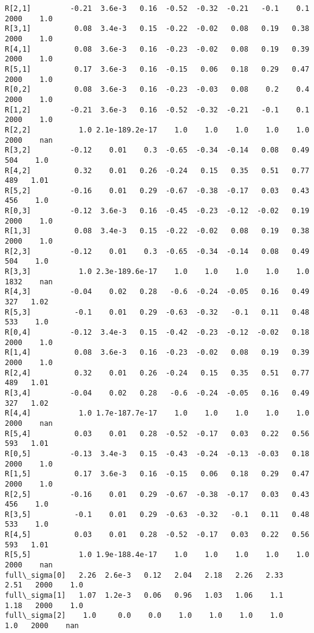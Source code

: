 \documentclass[11pt]{article}
\begin{document}
\begin{Verbatim}[commandchars=\\\{\}]
R[2,1]         -0.21  3.6e-3   0.16  -0.52  -0.32  -0.21   -0.1    0.1   2000    1.0
R[3,1]          0.08  3.4e-3   0.15  -0.22  -0.02   0.08   0.19   0.38   2000    1.0
R[4,1]          0.08  3.6e-3   0.16  -0.23  -0.02   0.08   0.19   0.39   2000    1.0
R[5,1]          0.17  3.6e-3   0.16  -0.15   0.06   0.18   0.29   0.47   2000    1.0
R[0,2]          0.08  3.6e-3   0.16  -0.23  -0.03   0.08    0.2    0.4   2000    1.0
R[1,2]         -0.21  3.6e-3   0.16  -0.52  -0.32  -0.21   -0.1    0.1   2000    1.0
R[2,2]           1.0 2.1e-189.2e-17    1.0    1.0    1.0    1.0    1.0   2000    nan
R[3,2]         -0.12    0.01    0.3  -0.65  -0.34  -0.14   0.08   0.49    504    1.0
R[4,2]          0.32    0.01   0.26  -0.24   0.15   0.35   0.51   0.77    489   1.01
R[5,2]         -0.16    0.01   0.29  -0.67  -0.38  -0.17   0.03   0.43    456    1.0
R[0,3]         -0.12  3.6e-3   0.16  -0.45  -0.23  -0.12  -0.02   0.19   2000    1.0
R[1,3]          0.08  3.4e-3   0.15  -0.22  -0.02   0.08   0.19   0.38   2000    1.0
R[2,3]         -0.12    0.01    0.3  -0.65  -0.34  -0.14   0.08   0.49    504    1.0
R[3,3]           1.0 2.3e-189.6e-17    1.0    1.0    1.0    1.0    1.0   1832    nan
R[4,3]         -0.04    0.02   0.28   -0.6  -0.24  -0.05   0.16   0.49    327   1.02
R[5,3]          -0.1    0.01   0.29  -0.63  -0.32   -0.1   0.11   0.48    533    1.0
R[0,4]         -0.12  3.4e-3   0.15  -0.42  -0.23  -0.12  -0.02   0.18   2000    1.0
R[1,4]          0.08  3.6e-3   0.16  -0.23  -0.02   0.08   0.19   0.39   2000    1.0
R[2,4]          0.32    0.01   0.26  -0.24   0.15   0.35   0.51   0.77    489   1.01
R[3,4]         -0.04    0.02   0.28   -0.6  -0.24  -0.05   0.16   0.49    327   1.02
R[4,4]           1.0 1.7e-187.7e-17    1.0    1.0    1.0    1.0    1.0   2000    nan
R[5,4]          0.03    0.01   0.28  -0.52  -0.17   0.03   0.22   0.56    593   1.01
R[0,5]         -0.13  3.4e-3   0.15  -0.43  -0.24  -0.13  -0.03   0.18   2000    1.0
R[1,5]          0.17  3.6e-3   0.16  -0.15   0.06   0.18   0.29   0.47   2000    1.0
R[2,5]         -0.16    0.01   0.29  -0.67  -0.38  -0.17   0.03   0.43    456    1.0
R[3,5]          -0.1    0.01   0.29  -0.63  -0.32   -0.1   0.11   0.48    533    1.0
R[4,5]          0.03    0.01   0.28  -0.52  -0.17   0.03   0.22   0.56    593   1.01
R[5,5]           1.0 1.9e-188.4e-17    1.0    1.0    1.0    1.0    1.0   2000    nan
full\_sigma[0]   2.26  2.6e-3   0.12   2.04   2.18   2.26   2.33   2.51   2000    1.0
full\_sigma[1]   1.07  1.2e-3   0.06   0.96   1.03   1.06    1.1   1.18   2000    1.0
full\_sigma[2]    1.0     0.0    0.0    1.0    1.0    1.0    1.0    1.0   2000    nan

\end{Verbatim}
\end{document}

